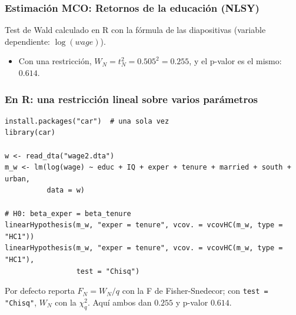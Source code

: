 \documentclass[t, compress, spanish, aspectratio=169]{beamer}
\begin{document}
\begin{frame}
\frametitle{Estimaci\'on MCO: Retornos de la educaci\'on (NLSY)}
Test de Wald calculado en R con la f\'ormula de las diapositivas (variable dependiente: $\log(wage)$).
\medskip
\begin{center}
\footnotesize

\end{center}
\begin{itemize}
    \item Con una restricci\'on, $W_N=t_N^2=0.505^2=0.255$, y el p-valor es el mismo: $0.614$.
\end{itemize}
\end{frame}
\begin{frame}[fragile]
	\frametitle{En R: una restricci\'on lineal sobre varios par\'ametros}
\footnotesize
\begin{verbatim}
install.packages("car")  # una sola vez
library(car)

w <- read_dta("wage2.dta")
m_w <- lm(log(wage) ~ educ + IQ + exper + tenure + married + south + urban,
          data = w)

# H0: beta_exper = beta_tenure
linearHypothesis(m_w, "exper = tenure", vcov. = vcovHC(m_w, type = "HC1"))
linearHypothesis(m_w, "exper = tenure", vcov. = vcovHC(m_w, type = "HC1"),
                 test = "Chisq")
\end{verbatim}
\small
Por defecto reporta $F_N=W_N/q$ con la F de Fisher-Snedecor; con \texttt{test = "Chisq"}, $W_N$ con la $\chi^2_q$. Aqu\'i ambos dan $0.255$ y p-valor $0.614$.
\end{frame}
\end{document}
